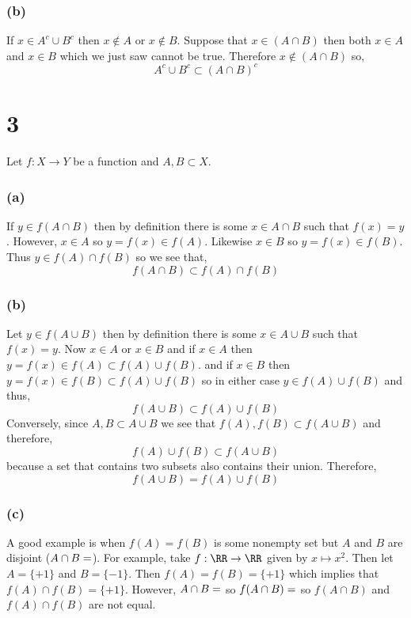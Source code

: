 \documentclass[12pt]{article}
\begin{document}
\subsubsection*{(b)}

If $x \in A^c \cup B^c$ then $x \notin A$ or $x \notin B$. Suppose that $x \in (A \cap B)$ then both $x \in A$ and $x \in B$ which we just saw cannot be true. Therefore $x \notin (A \cap B)$ so,
\[ A^c \cup B^c \subset (A \cap B)^c \]


\section*{3}

Let $f : X \to Y$ be a function and $A,B \subset X$.

\subsubsection*{(a)}

If $y \in f(A \cap B)$ then by definition there is some $x \in A \cap B$ such that $f(x) = y$. However, $x \in A$ so $y = f(x) \in f(A)$. Likewise $x \in B$ so $y = f(x) \in f(B)$. Thus $y \in f(A) \cap f(B)$ so we see that,
\[ f(A \cap B) \subset f(A) \cap f(B) \]

\subsubsection*{(b)}

Let $y \in f(A \cup B)$ then by definition there is some $x \in A \cup B$ such that $f(x) = y$. Now $x \in A$ or $x \in B$ and if $x \in A$ then $y = f(x) \in f(A) \subset f(A) \cup f(B)$. and if $x \in B$ then $y = f(x) \in f(B) \subset f(A) \cup f(B)$ so in either case $y \in f(A) \cup f(B)$ and thus,
\[ f(A \cup B) \subset f(A) \cup f(B) \]
Conversely, since $A, B \subset A \cup B$ we see that $f(A), f(B) \subset f(A \cup B)$ and therefore,
\[ f(A) \cup f(B) \subset  f(A \cup B) \]
because a set that contains two subsets also contains their union. Therefore,
\[ f(A \cup B) = f(A) \cup f(B) \]

\subsubsection*{(c)}

A good example is when $f(A) = f(B)$ is some nonempty set but $A$ and $B$ are disjoint ($A \cap B = \empty$). For example, take $f : \RR \to \RR$ given by $x \mapsto x^2$. Then let $A = \{ + 1 \}$ and $B = \{ - 1 \}$. Then $f(A) = f(B) = \{ + 1 \}$ which implies that $f(A) \cap f(B) = \{ + 1 \}$. However, $A \cap B = \empty$ so $f(A \cap B) = \empty$ so $f(A \cap B)$ and $f(A) \cap f(B)$ are not equal.
\end{document}
